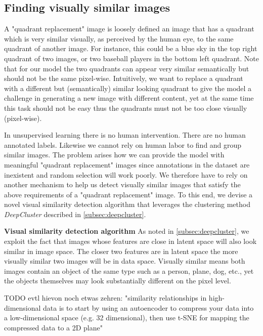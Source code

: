 \documentclass[12pt,a4paper]{article}
\begin{document}
\subsection{Finding visually similar images} \label{subsec:img_clustering}
A "quadrant replacement" image is loosely defined an image that has a quadrant which is very similar visually, as perceived by the human eye, to the same quadrant of another image. For instance, this could be a blue sky in the top right quadrant of two images, or two baseball players in the bottom left quadrant. Note that for our model the two quadrants can appear very similar semantically but should not be the same pixel-wise. Intuitively, we want to replace a quadrant with a different but (semantically) similar looking quadrant to give the model a challenge in generating a new image with different content, yet at the same time this task should not be easy thus the quadrants must not be too close visually (pixel-wise).

In unsupervised learning there is no human intervention. There are no human annotated labels. Likewise we cannot rely on human labor to find and group similar images. The problem arises how we can provide the model with meaningful "quadrant replacement" images since annotations in the dataset are inexistent and random selection will work poorly. We therefore have to rely on another mechanism to help us detect visually similar images that satisfy the above requirements of a "quadrant replacement" image. To this end, we devise a novel visual similarity detection algorithm that leverages the clustering method \textit{DeepCluster} described in \ref{subsec:deepcluster}.

\textbf{Visual similarity detection algorithm} As noted in \ref{subsec:deepcluster}, we exploit the fact that images whose features are close in latent space will also look similar in image space. The closer two features are in latent space the more visually similar two images will be in data space. Visually similar means both images contain an object of the same type such as a person, plane, dog, etc., yet the objects themselves may look substantially different on the pixel level.

TODO evtl hievon noch etwas zehren: "similarity relationships in high-dimensional data is to start by using an autoencoder to compress your data into a low-dimensional space (e.g. 32 dimensional), then use t-SNE for mapping the compressed data to a 2D plane"
\end{document}
